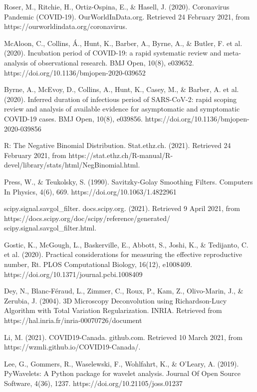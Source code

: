\documentclass{article}
\begin{document}
\begin{thebibliography}{2}

Roser, M., Ritchie, H., Ortiz-Ospina, E., \& Hasell, J. (2020). Coronavirus Pandemic (COVID-19). OurWorldInData.org. Retrieved 24 February 2021, from https://ourworldindata.org/coronavirus.

McAloon, C., Collins, Á., Hunt, K., Barber, A., Byrne, A., \& Butler, F. et al. (2020). Incubation period of COVID-19: a rapid systematic review and meta-analysis of observational research. BMJ Open, 10(8), e039652. https://doi.org/10.1136/bmjopen-2020-039652

Byrne, A., McEvoy, D., Collins, A., Hunt, K., Casey, M., \& Barber, A. et al. (2020). Inferred duration of infectious period of SARS-CoV-2: rapid scoping review and analysis of available evidence for asymptomatic and symptomatic COVID-19 cases. BMJ Open, 10(8), e039856. https://doi.org/10.1136/bmjopen-2020-039856

R: The Negative Binomial Distribution. Stat.ethz.ch. (2021). Retrieved 24 February 2021, from https://stat.ethz.ch/R-manual/R-devel/library/stats/html/NegBinomial.html.

Press, W., \& Teukolsky, S. (1990). Savitzky-Golay Smoothing Filters. Computers In Physics, 4(6), 669. https://doi.org/10.1063/1.4822961
    
scipy.signal.savgol\_filter. docs.scipy.org. (2021). Retrieved 9 April 2021, from https://docs.scipy.org/doc/scipy/reference/generated/ scipy.signal.savgol\_filter.html.

Gostic, K., McGough, L., Baskerville, E., Abbott, S., Joshi, K., \& Tedijanto, C. et al. (2020). Practical considerations for measuring the effective reproductive number, Rt. PLOS Computational Biology, 16(12), e1008409. https://doi.org/10.1371/journal.pcbi.1008409

Dey, N., Blanc-Féraud, L., Zimmer, C., Roux, P., Kam, Z., Olivo-Marin, J., \& Zerubia, J. (2004). 3D Microscopy Deconvolution using Richardson-Lucy Algorithm with Total Variation Regularization. INRIA. Retrieved from https://hal.inria.fr/inria-00070726/document

Li, M. (2021). COVID19-Canada. github.com. Retrieved 10 March 2021, from https://wzmli.github.io/COVID19-Canada/.

Lee, G., Gommers, R., Waselewski, F., Wohlfahrt, K., \& O'Leary, A. (2019). PyWavelets: A Python package for wavelet analysis. Journal Of Open Source Software, 4(36), 1237. https://doi.org/10.21105/joss.01237


\end{thebibliography}
\end{document}
